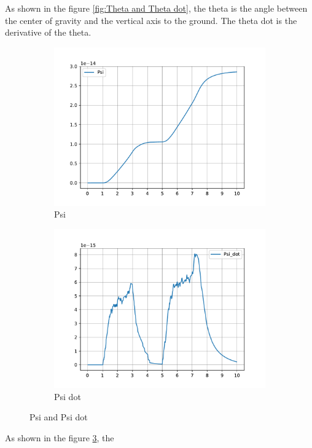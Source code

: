 As shown in the figure \ref{fig:Theta and Theta dot}, the theta is the angle between the center of gravity and the vertical axis to the ground. The theta dot is the derivative of the theta.
\begin{figure}[h]
	\centering
	\begin{subfigure}[t]{0.45\textwidth}
		\includegraphics[width=\textwidth]{Psi}
		\caption{Psi}
		\label{fig:Psi}
	\end{subfigure}
	\begin{subfigure}[t]{0.45\textwidth}
		\includegraphics[width=\textwidth]{Psi_dot}
		\caption{Psi dot}
		\label{fig:Psi dot}
	\end{subfigure}
	\caption{Psi and Psi dot}
	\label{fig:Psi and Psi dot}
\end{figure}
\newpage
As shown in the figure \ref{fig:Psi and Psi dot}, the


